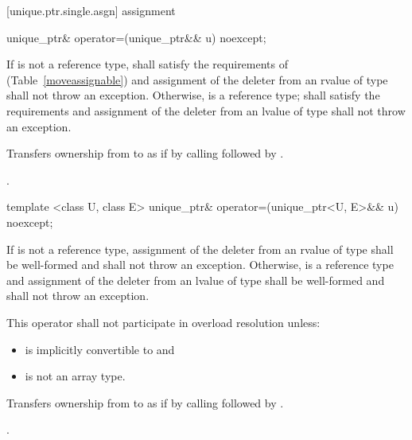 [unique.ptr.single.asgn]{ assignment}

\begin{itemdecl}
unique_ptr& operator=(unique_ptr&& u) noexcept;
\end{itemdecl}

\begin{itemdescr}
\pnum
\requires If  is not a reference type,  shall satisfy the
requirements of  (Table~\ref{moveassignable}) and assignment
of the deleter from an rvalue of type  shall not throw an exception.
Otherwise,  is a reference type;
 shall satisfy the 
requirements and assignment of the deleter from an
lvalue of type  shall not throw an exception.

\pnum
\effects
Transfers ownership from  to  as if by calling
 followed by
.

\pnum
\returns {}.
\end{itemdescr}

\begin{itemdecl}
template <class U, class E> unique_ptr& operator=(unique_ptr<U, E>&& u) noexcept;
\end{itemdecl}

\begin{itemdescr}
\pnum
\requires If  is not a reference type, assignment of the deleter from
an rvalue of type  shall be well-formed and shall not throw an exception.
Otherwise,  is a reference type and assignment of the deleter from an lvalue
of type  shall be well-formed and shall not throw an exception.

\pnum
\remarks This operator shall not participate in overload resolution unless:

\begin{itemize}
\item {} is implicitly convertible to  and
\item {} is not an array type.
\end{itemize}

\pnum
\effects Transfers ownership from  to  as if by calling
 followed by
.

\pnum
\returns {}.
\end{itemdescr}

